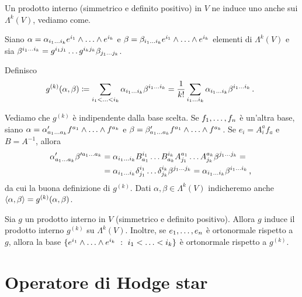 Un prodotto interno (simmetrico e definito positivo) in $V$ ne induce uno anche sui $\Lambda^k(V)$, vediamo come.

Siano $\alpha = \alpha_{\seqb ik{}} e^{i_1}\wedge\ldots\wedge e^{i_k}$ e $\beta = \beta_{\seqb ik{}} e^{i_1}\wedge\ldots\wedge e^{i_k}$ elementi di $\Lambda^k(V)$ e sia $\beta^{\seqb ik{}} = g^{i_1j_1}\ldots g^{i_kj_k} \beta_{\seqb jk{}}$.

Definisco
\begin{equation*}
	g^{(k)} (\alpha,\beta) \coloneqq \sum_{\seqb ik<} \alpha_{\seqb ik{}} \beta^{\seqb ik{}} 
	= \frac 1{k!} \sum_{\seqb ik{}} \alpha_{\seqb ik{}} \beta^{\seqb ik{}} \punto
\end{equation*}

Vediamo che $g^{(k)}$ è indipendente dalla base scelta.
Se $\seqb fn,$ è un'altra base, siano $\alpha = \alpha'_{\seqb ak{}} f^{a_1}\wedge\ldots\wedge f^{a_k}$ e $\beta = \beta'_{\seqb ak{}} f^{a_1}\wedge\ldots\wedge f^{a_k}$. Se $e_i =  A^a_i f_a$ e $B=A^{-1}$, allora
\begin{align*}
	\alpha'_{\seqb ak{}} \beta'^{\seqb ak{}} &= \alpha_{\seqb ik{}} B^{i_1}_{a_1}\ldots B^{i_k}_{a_k} A^{a_1}_{j_1}\ldots A^{a_k}_{j_k} \beta^{\seqb jk{}}= \\
	&= \alpha_{\seqb ik{}} \delta^{i_1}_{j_1}\ldots \delta^{i_k}_{j_k}\beta^{\seqb jk{}} =\alpha_{\seqb ik{}} \beta^{\seqb ik{}} \virgola
\end{align*}
da cui la buona definizione di $g^{(k)}$. Dati $\alpha,\beta \in \Lambda^k(V)$ indicheremo anche $\Scal\alpha\beta=g^{(k)}(\alpha,\beta)$.

\begin{proposition} \label{prop:BaseOrtonormaleMetricaLambdaK}
	Sia $g$ un prodotto interno in $V$ (simmetrico e definito positivo). Allora $g$ induce il prodotto interno $g^{(k)}$ su $\Lambda^k(V)$. Inoltre, se $\seqb en,$ è ortonormale rispetto a $g$, allora la base $\{e^{i_1}\wedge\ldots\wedge e^{i_k} \suchthat \seqb ik< \}$ è ortonormale rispetto a $g^{(k)}$.
\end{proposition}

\section{Operatore di Hodge star}

